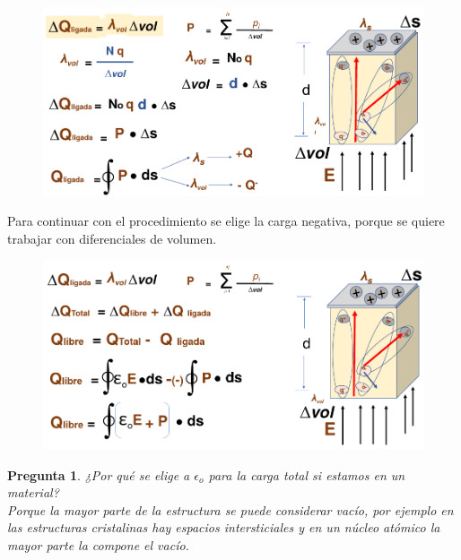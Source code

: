 \documentclass[12pt,letterpaper]{book}
\newtheorem{question}{Pregunta}[section]
\begin{document}
\begin{figure}[H]
\centering
\includegraphics[width=1\linewidth]{figures/carFre2.png}
\caption{}
\label{carFre2}
\end{figure}
\vspace{0.2cm}

Para continuar con el procedimiento se elige la carga negativa, porque se quiere trabajar con diferenciales de volumen.

\begin{figure}[H]
\centering
\includegraphics[width=1\linewidth]{figures/carFre3.png}
\caption{}
\label{carFre3}
\end{figure}
\vspace{0.2cm}

\begin{question}
¿Por qué se elige a $\epsilon _o$ para la carga total si estamos en un material?\\
Porque la mayor parte de la estructura se puede considerar vacío, por ejemplo en las estructuras cristalinas hay espacios intersticiales y en un núcleo atómico la mayor parte la compone el vacío.
\end{question}
\end{document}
